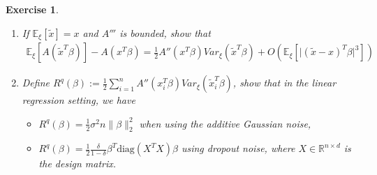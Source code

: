 \documentclass[12pt]{article}
\theoremstyle{colon}
\newtheorem{exercise}{Exercise}
\begin{document}
\begin{exercise}
\begin{enumerate}[label=\arabic*)]
    \begin{gather*}
      R(\beta) = \sum_{i=1}^n \left( \mathbb{E}[A(\tilde{x}_i^T \beta)] - A(x_i^T \beta) \right)
    \end{gather*}
    \item If $\mathbb{E}_\xi [\tilde{x}] = x$ and $A'''$ is bounded, show that
      \begin{gather*}
        \mathbb{E}_\xi [A(\tilde{x}^T \beta)] - A(x^T \beta) = \frac{1}{2} A''(x^T \beta) Var_\xi (\tilde{x}^T \beta) + O(\mathbb{E}_\xi [\lvert (\tilde{x} - x)^T \beta \rvert^3])
      \end{gather*}
    \item Define $R^q (\beta) := \frac{1}{2} \sum_{i=1}^n A'' (x_i^T \beta) Var_\xi (\tilde{x}_i^T \beta)$, show that in the linear regression setting, we have
      \begin{itemize}
        \item $R^q (\beta) = \frac{1}{2} \sigma^2 n \lVert \beta \rVert_2^2$ when using the additive Gaussian noise,
        \item $R^q (\beta) = \frac{1}{2} \frac{\delta}{1-\delta} \beta^T \text{diag}(X^T X) \beta$ using dropout noise, where $X \in \mathbb{R}^{n \times d}$ is the design matrix.
      \end{itemize}
  \end{enumerate}
\end{exercise}
\end{document}
